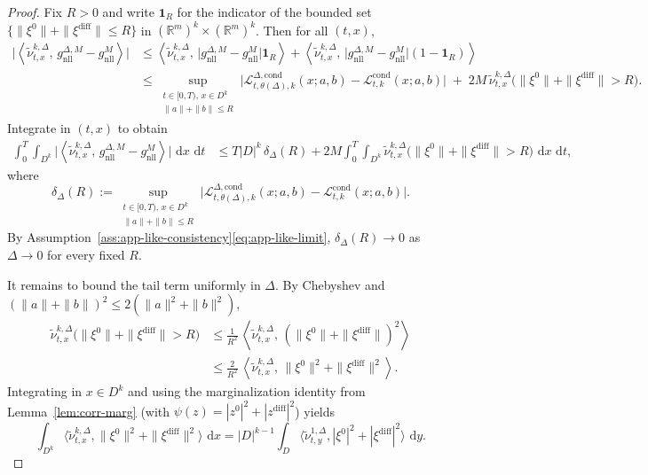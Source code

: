 \documentclass{article}
\numberwithin{equation}{section}
\theoremstyle{plain}
\theoremstyle{definition}
\theoremstyle{remark}
\newcommand{\R}{\mathbb{R}}
\newcommand{\dd}{\,\mathrm{d}}
\newcommand{\ip}[2]{\left\langle #1,\,#2 \right\rangle}
\begin{document}
\begin{proof}
Fix $R>0$ and write $\mathbf 1_R$ for the indicator of the bounded set
$\{\| \xi^0\|+\|\xi^{\mathrm{diff}}\|\le R\}$ in $(\R^m)^k\times(\R^m)^k$.
Then for all $(t,x)$,
\begin{align*}
\Big|\ip{\widetilde\nu^{k,\Delta}_{t,x}}{g^{\Delta,M}_{\mathrm{nll}}-g^{M}_{\mathrm{nll}}}\Big|
&\le
\ip{\widetilde\nu^{k,\Delta}_{t,x}}{\big|g^{\Delta,M}_{\mathrm{nll}}-g^{M}_{\mathrm{nll}}\big|\mathbf 1_R}
+
\ip{\widetilde\nu^{k,\Delta}_{t,x}}{\big|g^{\Delta,M}_{\mathrm{nll}}-g^{M}_{\mathrm{nll}}\big|(1-\mathbf 1_R)} \\
&\le
\sup_{\substack{t\in[0,T),\,x\in D^k\\ \|a\|+\|b\|\le R}}
\big|\mathcal L^{\Delta,\mathrm{cond}}_{t,\theta(\Delta),k}(x;a,b)-\mathcal L^{\mathrm{cond}}_{t,k}(x;a,b)\big|
\;+\; 2M\,\widetilde\nu^{k,\Delta}_{t,x}\big(\| \xi^0\|+\|\xi^{\mathrm{diff}}\|>R\big).
\end{align*}
Integrate in $(t,x)$ to obtain
\begin{align}
\int_0^T\!\!\int_{D^k}
\Big|\ip{\widetilde\nu^{k,\Delta}_{t,x}}{g^{\Delta,M}_{\mathrm{nll}}-g^{M}_{\mathrm{nll}}}\Big|\,\dd x\,\dd t
&\le
T|D|^k\,\delta_\Delta(R)
+
2M\int_0^T\!\!\int_{D^k}\widetilde\nu^{k,\Delta}_{t,x}\big(\| \xi^0\|+\|\xi^{\mathrm{diff}}\|>R\big)\,\dd x\,\dd t,
\label{eq:split-bounded-tail}
\end{align}
where
\[
\delta_\Delta(R):=
\sup_{\substack{t\in[0,T),\,x\in D^k\\ \|a\|+\|b\|\le R}}
\big|\mathcal L^{\Delta,\mathrm{cond}}_{t,\theta(\Delta),k}(x;a,b)-\mathcal L^{\mathrm{cond}}_{t,k}(x;a,b)\big|.
\]
By Assumption~\ref{ass:app-like-consistency}\eqref{eq:app-like-limit}, $\delta_\Delta(R)\to0$ as $\Delta\to0$ for every fixed $R$.

It remains to bound the tail term uniformly in $\Delta$. By Chebyshev and $(\|a\|+\|b\|)^2\le 2(\|a\|^2+\|b\|^2)$,
\begin{align*}
\widetilde\nu^{k,\Delta}_{t,x}\big(\| \xi^0\|+\|\xi^{\mathrm{diff}}\|>R\big)
&\le \frac{1}{R^2}\,\ip{\widetilde\nu^{k,\Delta}_{t,x}}{(\|\xi^0\|+\|\xi^{\mathrm{diff}}\|)^2}\\
&\le \frac{2}{R^2}\,\ip{\widetilde\nu^{k,\Delta}_{t,x}}{\|\xi^0\|^2+\|\xi^{\mathrm{diff}}\|^2}.
\end{align*}
Integrating in $x\in D^k$ and using the marginalization identity from Lemma~\ref{lem:corr-marg} (with $\psi(z)=|z^0|^2+|z^{\mathrm{diff}}|^2$)
yields
\[
\int_{D^k}\Big\langle \widetilde\nu^{k,\Delta}_{t,x},\|\xi^0\|^2+\|\xi^{\mathrm{diff}}\|^2\Big\rangle\,\dd x
=
|D|^{k-1}\int_D \Big\langle \widetilde\nu^{1,\Delta}_{t,y},|\xi^0|^2+|\xi^{\mathrm{diff}}|^2\Big\rangle\,\dd y.
\]


\end{proof}
\end{document}
